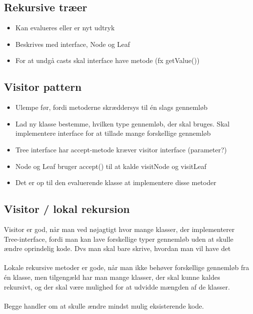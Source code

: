 \subsection{Rekursive træer} %
\label{sub:rekursive_tr_er}
\begin{itemize}
    \item Kan evalueres eller er nyt udtryk
    \item Beskrives med interface, Node og Leaf
    \item For at undgå casts skal interface have metode (fx getValue())
\end{itemize}
\subsection{Visitor pattern} %
\label{sub:visitor_pattern}
\begin{itemize}
    \item Ulempe før, fordi metoderne skræddersys til én slags gennemløb
    \item Lad ny klasse bestemme, hvilken type gennemløb, der skal bruges. Skal implementere interface for at tillade mange forskellige gennemløb
    \item Tree interface har accept-metode kræver visitor interface (parameter?)
    \item Node og Leaf bruger accept() til at kalde visitNode og visitLeaf
    \item Det er op til den evaluerende klasse at implementere disse metoder
\end{itemize}

\subsection{Visitor / lokal rekursion} %
\label{sub:visitor_almindelig_rekursion}
Visitor er god, når man ved nøjagtigt hvor mange klasser, der implementerer Tree-interface, fordi man kan lave forskellige typer gennemløb uden at skulle ændre oprindelig kode. Dvs man skal bare skrive, hvordan man vil have det\\
\\
Lokale rekursive metoder er gode, når man ikke behøver forskellige gennemløb fra én klasse, men tilgengæld har man mange klasser, der skal kunne kaldes rekursivt, og der skal være mulighed for at udvidde mængden af de klasser.\\
\\
Begge handler om at skulle ændre mindst mulig eksisterende kode.

